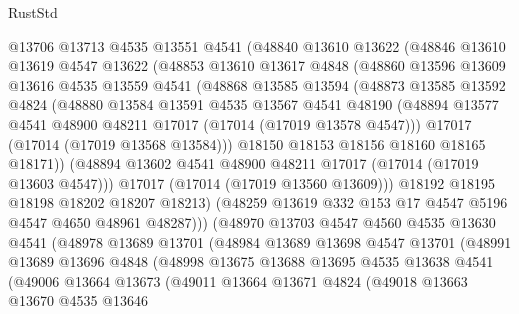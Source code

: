 \begin{lexlean}{RustStd}
\begin{coremodule}
{\begin{coremodule}
{{{{{{{{{{{{{{{{{{{{{{{{{{{{{{{{{{{{{{{{{{{{{{{{{{{{{{{          @13706
          @13713
          @4535
          @13551
          @4541
          (@48840
            @13610
            @13622
            (@48846
              @13610
              @13619
              @4547
              @13622
              (@48853
                @13610
                @13617
                @4848
                (@48860
                  @13596
                  @13609
                  @13616
                  @4535
                  @13559
                  @4541
                  (@48868
                    @13585
                    @13594
                    (@48873
                      @13585
                      @13592
                      @4824
                      (@48880
                        @13584
                        @13591
                        @4535
                        @13567
                        @4541
                        @48190
                        (@48894 @13577 @4541 @48900 @48211 @17017 (@17014 (@17019 @13578 @4547)))
                        @17017
                        (@17014 (@17019 @13568 @13584)))
                      @18150
                      @18153
                      @18156
                      @18160
                      @18165
                      @18171))
                  (@48894 @13602 @4541 @48900 @48211 @17017 (@17014 (@17019 @13603 @4547)))
                  @17017
                  (@17014 (@17019 @13560 @13609)))
                @18192
                @18195
                @18198
                @18202
                @18207
                @18213)
              (@48259 @13619 @332 @153 @17 @4547 @5196 @4547 @4650 @48961 @48287)))
          (@48970
            @13703
            @4547
            @4560
            @4535
            @13630
            @4541
            (@48978
              @13689
              @13701
              (@48984
                @13689
                @13698
                @4547
                @13701
                (@48991
                  @13689
                  @13696
                  @4848
                  (@48998
                    @13675
                    @13688
                    @13695
                    @4535
                    @13638
                    @4541
                    (@49006
                      @13664
                      @13673
                      (@49011
                        @13664
                        @13671
                        @4824
                        (@49018
                          @13663
                          @13670
                          @4535
                          @13646
}}}}}}}}}}}}}}}}}}}}}}}}}}}}}}}}}}}}}}}}}}}}}}}}}}}}}}}
\end{coremodule}}
\end{coremodule}
\end{lexlean}
